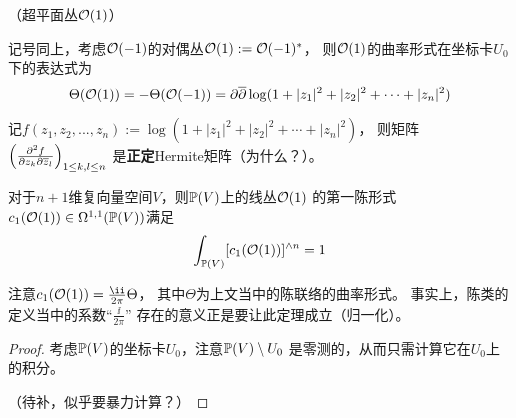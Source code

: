 
\begin{example}（超平面丛$\mathcal{O}(1)$）
\label{复射影空间上的超平面丛-example}

记号同上，考虑$\mathcal{O}(-1)$的对偶丛$\mathcal{O}(1):=\mathcal{O}(-1)^*$，
则$\mathcal{O}(1)$的曲率形式在坐标卡$U_0$下的表达式为
$$
  \Theta(\mathcal{O}(1))=-\Theta(\mathcal{O}(-1))
=
  \partial\overline{\partial}\log(1+|z_1|^2+|z_2|^2+\cdots+|z_n|^2)
$$
\end{example}

{\color{blue}
记$f(z_1,z_2,...,z_n):=\log(1+|z_1|^2+|z_2|^2+\cdots+|z_n|^2)$，
则矩阵$\left(\frac{\partial^2{f}} {\partial{z_k}\partial{\overline{z}_l}}\right)_{1\leq k,l\leq n}$
是\textbf{正定}Hermite矩阵（为什么？）。
}


\begin{thm}
对于$n+1$维复向量空间$V$，则$\mathbb{P}(V)$上的线丛$\mathcal{O}(1)$
的第一陈形式$c_1(\mathcal{O}(1))\in\Omega^{1,1}(\mathbb{P}(V))$满足
$$
  \int_{\mathbb{P}(V)}
    [c_1(\mathcal{O}(1))]^{\wedge n}
=1
$$
\end{thm}


注意$c_1(\mcalO(1))=\frac{\ii}{2\pi}\Theta$，
其中$\Theta$为上文当中的陈联络的曲率形式。
事实上，陈类的定义当中的系数“$\frac{\ii}{2\pi}$”
存在的意义正是要让此定理成立（归一化）。

\begin{proof}
考虑$\mathbb{P}(V)$的坐标卡$U_0$，注意$\mathbb{P}(V)\setminus U_0$
是零测的，从而只需计算它在$U_0$上的积分。

{\color{red}（待补，似乎要暴力计算？）}
\end{proof}





